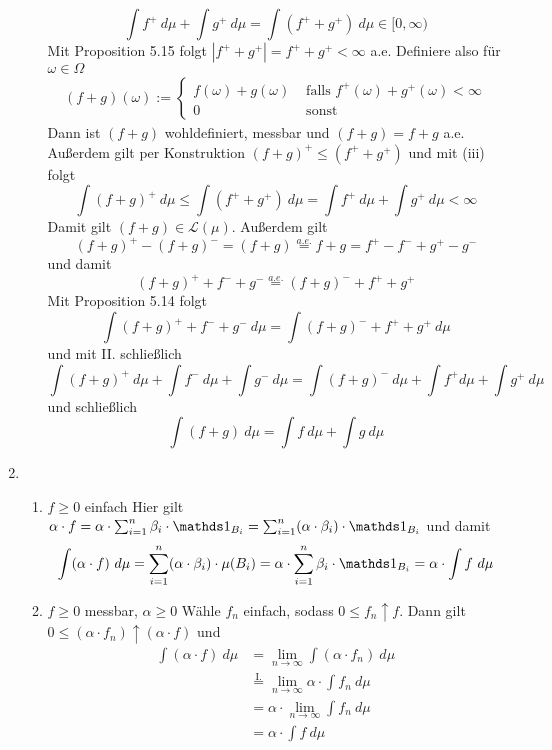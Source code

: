 \documentclass[12pt]{report}
\begin{document}
\begin{enumerate}[label=(\roman*)]
\begin{enumerate}[label=\Roman*.]
        $$\int f^+\ d\mu+\int g^+\ d\mu=\int(f^++g^+)\ d\mu\in[0,\infty)$$
        Mit Proposition 5.15 folgt $|f^++g^+|=f^++g^+<\infty$ a.e. Definiere also f\"ur $\omega\in\Omega$
        \begin{align*}
            (f+g)(\omega):=
            \begin{cases}
                f(\omega)+g(\omega)&\text{ falls }f^+(\omega)+g^+(\omega)<\infty\\
                0&\text{ sonst}
            \end{cases}
        \end{align*}
        Dann ist $(f+g)$ wohldefiniert, messbar und $(f+g)=f+g$ a.e. Au\ss{}erdem gilt per Konstruktion $(f+g)^+\leq(f^++g^+)$ und mit (iii) folgt
        $$\int (f+g)^+\ d\mu\leq\int (f^++g^+)\ d\mu=\int f^+\ d\mu+\int g^+\ d\mu<\infty$$
        Damit gilt $(f+g)\in\mathcal{L}(\mu)$. Au\ss{}erdem gilt
        $$(f+g)^+-(f+g)^-=(f+g)\overset{a.e.}{=}f+g=f^+-f^-+g^+-g^-$$
        und damit 
        $$(f+g)^++f^-+g^-\overset{a.e.}{=}(f+g)^-+f^++g^+$$
        Mit Proposition 5.14 folgt 
        $$\int(f+g)^++f^-+g^-\ d\mu=\int (f+g)^-+f^++g^+\ d\mu$$
        und mit II. schlie\ss{}lich
        $$\int(f+g)^+\ d\mu+\int f^-\ d\mu+\int g^-\ d\mu=\int (f+g)^-\ d\mu+\int f^+  d\mu+\int g^+\ d\mu$$
        und schlie\ss{}lich
        $$\int (f+g)\ d\mu=\int f\ d\mu+\int g\ d\mu$$
     \end{enumerate}
     \item 
     \begin{enumerate}[label=\Roman*.]
        \item $f\geq0$ einfach\newline
        Hier gilt $\alpha\cdot f =\alpha\cdot \sum_{i=1}^n\beta_i\cdot\ind{B_i}=\sum_{i=1}^n(\alpha\cdot\beta_i)\cdot\ind{B_i}$ und damit
        $$\int (\alpha\cdot f)\ d\mu=\sum_{i=1}^n(\alpha\cdot\beta_i)\cdot\mu(B_i)=\alpha\cdot\sum_{i=1}^n\beta_i\cdot\ind{B_i}=\alpha\cdot\int f\ d\mu$$
        \item $f\geq0$ messbar, $\alpha\geq 0$\newline
        W\"ahle $f_n$ einfach, sodass $0\leq f_n\uparrow f$. Dann gilt $0\leq(\alpha\cdot f_n)\uparrow (\alpha\cdot f)$ und 
        \begin{align*}
            \int (\alpha\cdot f)\ d\mu&=\lim_{n\to\infty}\int (\alpha\cdot f_n)\ d\mu\\&\overset{\text{I.}}{=}\lim_{n\to\infty}\alpha\cdot\int f_n\ d\mu\\&=\alpha\cdot\lim_{n\to\infty}\int f_n\ d\mu\\&=\alpha\cdot\int f\ d\mu

\end{align*}
\end{enumerate}
\end{enumerate}
\end{document}
